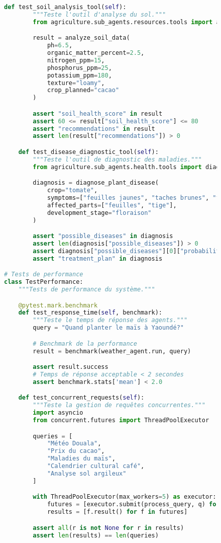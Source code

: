 \begin{figure}[h]
\begin{lstlisting}[language=Python, caption=Framework de tests unitaires pour agents ADK]
    def test_soil_analysis_tool(self):
        """Teste l'outil d'analyse du sol."""
        from agriculture.sub_agents.resources.tools import analyze_soil_data

        result = analyze_soil_data(
            ph=6.5,
            organic_matter_percent=2.5,
            nitrogen_ppm=15,
            phosphorus_ppm=25,
            potassium_ppm=180,
            texture="loamy",
            crop_planned="cacao"
        )

        assert "soil_health_score" in result
        assert 60 <= result["soil_health_score"] <= 80
        assert "recommendations" in result
        assert len(result["recommendations"]) > 0

    def test_disease_diagnostic_tool(self):
        """Teste l'outil de diagnostic des maladies."""
        from agriculture.sub_agents.health.tools import diagnose_plant_disease

        diagnosis = diagnose_plant_disease(
            crop="tomate",
            symptoms=["feuilles jaunes", "taches brunes", "flétrissement"],
            affected_parts=["feuilles", "tige"],
            development_stage="floraison"
        )

        assert "possible_diseases" in diagnosis
        assert len(diagnosis["possible_diseases"]) > 0
        assert diagnosis["possible_diseases"][0]["probability"] > 50
        assert "treatment_plan" in diagnosis

# Tests de performance
class TestPerformance:
    """Tests de performance du système."""

    @pytest.mark.benchmark
    def test_response_time(self, benchmark):
        """Teste le temps de réponse des agents."""
        query = "Quand planter le maïs à Yaoundé?"

        # Benchmark de la performance
        result = benchmark(weather_agent.run, query)

        assert result.success
        # Temps de réponse acceptable < 2 secondes
        assert benchmark.stats['mean'] < 2.0

    def test_concurrent_requests(self):
        """Teste la gestion de requêtes concurrentes."""
        import asyncio
        from concurrent.futures import ThreadPoolExecutor

        queries = [
            "Météo Douala",
            "Prix du cacao",
            "Maladies du maïs",
            "Calendrier cultural café",
            "Analyse sol argileux"
        ]

        with ThreadPoolExecutor(max_workers=5) as executor:
            futures = [executor.submit(process_query, q) for q in queries]
            results = [f.result() for f in futures]

        assert all(r is not None for r in results)
        assert len(results) == len(queries)
\end{lstlisting}
\end{figure}

